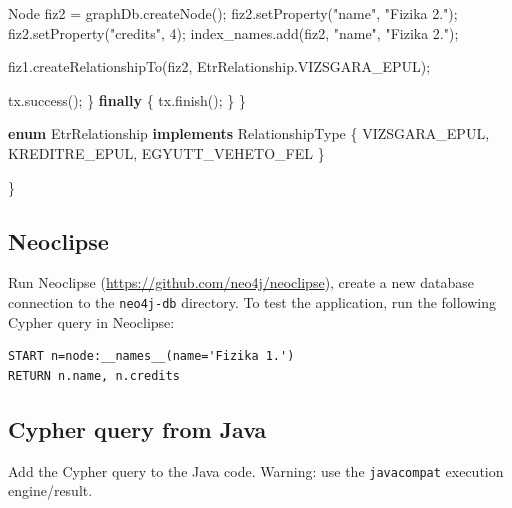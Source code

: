 \documentclass[]{report}
\newenvironment{Shaded}{}{}
\newcommand{\KeywordTok}[1]{\textcolor[rgb]{0.00,0.44,0.13}{\textbf{{#1}}}}
\newcommand{\DecValTok}[1]{\textcolor[rgb]{0.25,0.63,0.44}{{#1}}}
\newcommand{\StringTok}[1]{\textcolor[rgb]{0.25,0.44,0.63}{{#1}}}
\newcommand{\FunctionTok}[1]{\textcolor[rgb]{0.02,0.16,0.49}{{#1}}}
\newcommand{\NormalTok}[1]{{#1}}
\begin{document}
\begin{Shaded}
\begin{Highlighting}[]
            \NormalTok{Node fiz2 = graphDb.}\FunctionTok{createNode}\NormalTok{();}
            \NormalTok{fiz2.}\FunctionTok{setProperty}\NormalTok{(}\StringTok{"name"}\NormalTok{, }\StringTok{"Fizika 2."}\NormalTok{);}
            \NormalTok{fiz2.}\FunctionTok{setProperty}\NormalTok{(}\StringTok{"credits"}\NormalTok{, }\DecValTok{4}\NormalTok{);}
            \NormalTok{index_names.}\FunctionTok{add}\NormalTok{(fiz2, }\StringTok{"name"}\NormalTok{, }\StringTok{"Fizika 2."}\NormalTok{);}

            \NormalTok{fiz1.}\FunctionTok{createRelationshipTo}\NormalTok{(fiz2, EtrRelationship.}\FunctionTok{VIZSGARA_EPUL}\NormalTok{);}

            \NormalTok{tx.}\FunctionTok{success}\NormalTok{();}
        \NormalTok{\} }\KeywordTok{finally} \NormalTok{\{}
            \NormalTok{tx.}\FunctionTok{finish}\NormalTok{();}
        \NormalTok{\}}
    \NormalTok{\}}

    \KeywordTok{enum} \NormalTok{EtrRelationship }\KeywordTok{implements} \NormalTok{RelationshipType \{}
        \NormalTok{VIZSGARA_EPUL, KREDITRE_EPUL, EGYUTT_VEHETO_FEL}
    \NormalTok{\}}

\NormalTok{\}}
\end{Highlighting}
\end{Shaded}

\subsection{Neoclipse}

Run Neoclipse (\url{https://github.com/neo4j/neoclipse}), create a new
database connection to the \texttt{neo4j-db} directory. To test the
application, run the following Cypher query in Neoclipse:

\begin{verbatim}
START n=node:__names__(name='Fizika 1.')
RETURN n.name, n.credits
\end{verbatim}

\subsection{Cypher query from Java}

Add the Cypher query to the Java code. Warning: use the
\texttt{javacompat} execution engine/result.
\end{document}

